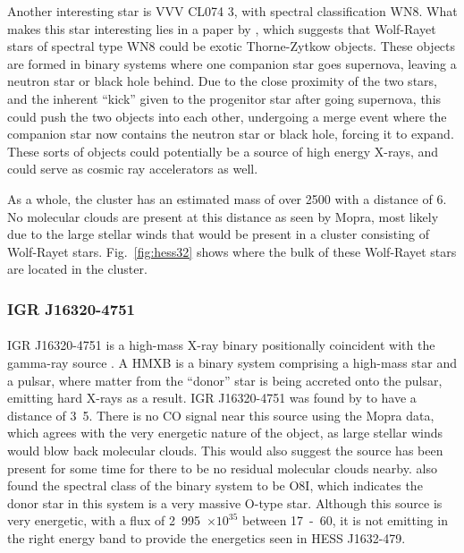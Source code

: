 \documentclass[a4paper, titlepage, oneside]{article}
\newcommand{\e}[1]{\ensuremath{\times 10^{#1}}}
\newcommand{\smass}{\mathrm{M_\odot}}
\newcommand{\parsec}{\mathrm{pc}}
\newcommand{\erg}{\mathrm{erg}}
\begin{document}
\begin{multicols}{2}
Another interesting star is VVV CL074 3, with spectral classification WN8. What makes this star interesting lies in a paper by \textcite{Foellmi:2002}, which suggests that Wolf-Rayet stars of spectral type WN8 could be exotic Thorne-Zytkow objects. These objects are formed in binary systems where one companion star goes supernova, leaving a neutron star or black hole behind. Due to the close proximity of the two stars, and the inherent ``kick'' given to the progenitor star after going supernova, this could push the two objects into each other, undergoing a merge event where the companion star now contains the neutron star or black hole, forcing it to expand. These sorts of objects could potentially be a source of high energy X-rays, and could serve as cosmic ray accelerators as well.

As a whole, the cluster has an estimated mass of over \unit{2500}{\smass} with a distance of \unit{6}{\kilo\parsec}. No molecular clouds are present at this distance as seen by Mopra, most likely due to the large stellar winds that would be present in a cluster consisting of Wolf-Rayet stars. Fig.~\ref{fig:hess32} shows where the bulk of these Wolf-Rayet stars are located in the cluster.

\subsubsection{IGR J16320-4751}
\paragraph{}
IGR J16320-4751 is a high-mass X-ray binary positionally coincident with the gamma-ray source \parencite{Aharonian:2006}. A HMXB is a binary system comprising a high-mass star and a pulsar, where matter from the ``donor'' star is being accreted onto the pulsar, emitting hard X-rays as a result. IGR J16320-4751 was found by \textcite{Lutovinov:2013} to have a distance of \unit{3.5}{\kilo\parsec}. There is no CO signal near this source using the Mopra data, which agrees with the very energetic nature of the object, as large stellar winds would blow back molecular clouds. This would also suggest the source has been present for some time for there to be no residual molecular clouds nearby. \textcite{Lutovinov:2013} also found the spectral class of the binary system to be O8I, which indicates the donor star in this system is a very massive O-type star. Although this source is very energetic, with a flux of \unit{2.995\e{35}}{\erg\usk\reciprocal\second} between \unit{17-60}{\kilo\electronvolt}, it is not emitting in the right energy band to provide the energetics seen in HESS J1632-479.


\end{multicols}
\end{document}
